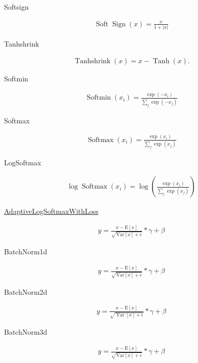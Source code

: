 Softsign

\begin{align}
  \operatorname{Soft} \operatorname{Sign}(x)=\frac{x}{1+|x|}
\end{align}

Tanhshrink

\begin{align}
  \operatorname{Tanhshrink} (x)=x- \operatorname{Tanh} (x).
\end{align}

Softmin

\begin{align}
 \operatorname{Softmin}\left(x_{i}\right)=\frac{\exp \left(-x_{i}\right)}{\sum_{j} \exp \left(-x_{j}\right)}
\end{align}

Softmax

\begin{align}
  \operatorname{Softmax}\left(x_{i}\right)=\frac{\exp \left(x_{i}\right)}{\sum_{j} \exp \left(x_{j}\right)}
\end{align}

LogSoftmax

\begin{align}
  \log \operatorname{Softmax}\left(x_{i}\right)=\log \left(\frac{\exp \left(x_{i}\right)}{\sum_{j} \exp \left(x_{j}\right)}\right)
\end{align}


\href{https://pytorch.org/docs/stable/nn.html#torch.nn.Softshrink}{AdaptiveLogSoftmaxWithLoss}

\begin{align}
  y=\frac{x-\mathrm{E}[x]}{\sqrt{\mathrm{Var}[x]+\epsilon}} * \gamma+\beta
\end{align}

BatchNorm1d

\begin{align}
y=\frac{x-\mathrm{E}[x]}{\sqrt{\mathrm{Var}[x]+\epsilon}} * \gamma+\beta
\end{align}

BatchNorm2d

\begin{align}
  y=\frac{x-\mathrm{E}[x]}{\sqrt{\operatorname{Var}[x]+\epsilon}} * \gamma+\beta
\end{align}

BatchNorm3d

\begin{align}
  y=\frac{x-\mathrm{E}[x]}{\sqrt{\mathrm{Var}[x]+\epsilon}} * \gamma+\beta
\end{align}


